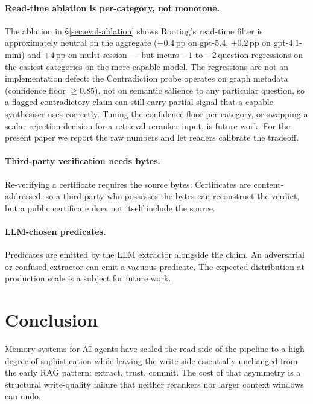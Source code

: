 \documentclass[10pt,a4paper]{article}
\begin{document}
\paragraph{Read-time ablation is per-category, not monotone.}
\begin{sloppypar}
The ablation in \S\ref{sec:eval-ablation} shows Rooting's read-time
filter is approximately neutral on the aggregate ($-0.4$\,pp on
gpt-5.4, $+0.2$\,pp on gpt-4.1-mini) and $+4$\,pp on multi-session ---
but incurs $-1$ to $-2$\,question regressions on the easiest
categories on the more capable model. The regressions are not an
implementation defect: the Contradiction probe operates on graph
metadata (confidence floor $\geq 0.85$), not on semantic salience to
any particular question, so a flagged-contradictory claim can still
carry partial signal that a capable synthesiser uses correctly.
Tuning the confidence floor per-category, or swapping a scalar
rejection decision for a retrieval reranker input, is future work.
For the present paper we report the raw numbers and let readers
calibrate the tradeoff.
\end{sloppypar}

\paragraph{Third-party verification needs bytes.}
Re-verifying a certificate requires the source bytes. Certificates are
content-addressed, so a third party who possesses the bytes can reconstruct
the verdict, but a public certificate does not itself include the source.

\paragraph{LLM-chosen predicates.}
Predicates are emitted by the LLM extractor alongside the claim. An
adversarial or confused extractor can emit a vacuous predicate. The
expected distribution at production scale is a subject for future work.

\section{Conclusion}
\label{sec:conclusion}

Memory systems for AI agents have scaled the read side of the pipeline to a
high degree of sophistication while leaving the write side essentially
unchanged from the early RAG pattern: extract, trust, commit. The cost of
that asymmetry is a structural write-quality failure that neither rerankers
nor larger context windows can undo.
\end{document}
